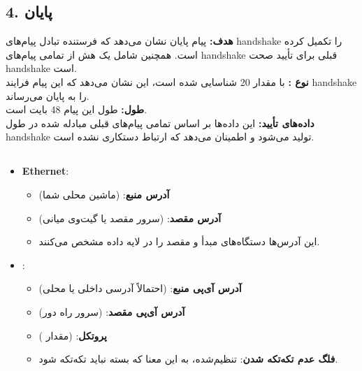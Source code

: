 \subsection*{4. پایان}
\textbf{هدف:} پیام پایان نشان می‌دهد که فرستنده تبادل پیام‌های handshake را تکمیل کرده است. همچنین شامل یک هش از تمامی پیام‌های handshake قبلی برای تأیید صحت handshake است.\\
\textbf{نوع :} با مقدار 20 شناسایی شده است، این نشان می‌دهد که این پیام فرایند handshake را به پایان می‌رساند.\\
\textbf{طول:} طول این پیام 48 بایت است.\\
\textbf{داده‌های تأیید:} این داده‌ها بر اساس تمامی پیام‌های قبلی مبادله شده در طول handshake تولید می‌شود و اطمینان می‌دهد که ارتباط دستکاری نشده است.

\subsection*{}
\begin{itemize}
    \item \textbf{Ethernet}:
    \begin{itemize}
        \item \textbf{آدرس  منبع}:  (ماشین محلی شما)
        \item \textbf{آدرس  مقصد}:  (سرور مقصد یا گیت‌وی میانی)
        \item این آدرس‌ها دستگاه‌های مبدأ و مقصد را در لایه داده مشخص می‌کنند.
    \end{itemize}
    \item \textbf{}:
    \begin{itemize}
        \item \textbf{آدرس آی‌پی منبع}:  (احتمالاً آدرسی داخلی یا محلی)
        \item \textbf{آدرس آی‌پی مقصد}:  (سرور راه دور)
        \item \textbf{پروتکل}:  (مقدار )
        \item \textbf{فلگ عدم تکه‌تکه شدن}: تنظیم‌شده، به این معنا که بسته نباید تکه‌تکه شود.
    \end{itemize}
\end{itemize}

